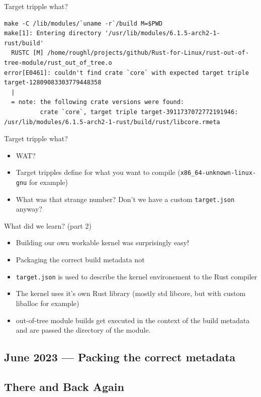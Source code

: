 \begin{frame}[c,fragile]{Target tripple what?}
  \begin{verbatim}
make -C /lib/modules/`uname -r`/build M=$PWD
make[1]: Entering directory '/usr/lib/modules/6.1.5-arch2-1-rust/build'
  RUSTC [M] /home/roughl/projects/github/Rust-for-Linux/rust-out-of-tree-module/rust_out_of_tree.o
error[E0461]: couldn't find crate `core` with expected target triple target-12809083303779448358
  |
  = note: the following crate versions were found:
          crate `core`, target triple target-3911737072772191946: /usr/lib/modules/6.1.5-arch2-1-rust/build/rust/libcore.rmeta
  \end{verbatim}
\end{frame}

\begin{frame}[c,fragile]{Target tripple what?}
  \begin{itemize}
    \item WAT?
    \item Target tripples define for what you want to compile
      (\texttt{x86\_64-unknown-linux-gnu} for example)
    \item What was that strange number? Don't we have a custom
      \texttt{target.json} anyway?
  \end{itemize}
\end{frame}

\begin{frame}[c]{What did we learn? (part 2)}
  \small
  \begin{itemize}
    \item Building our own workable kernel was surprisingly easy!
    \item Packaging the correct build metadata not
    \item \texttt{target.json} is used to describe the kernel environement to
      the Rust compiler
    \item The kernel uses it's own Rust library (mostly std libcore, but with
      custom liballoc for example)
    \item out-of-tree module builds get executed in the context of the build
      metadata and are passed the directory of the module.
  \end{itemize}
\end{frame}

\subsection{June 2023 — Packing the correct metadata}

\subsection{There and Back Again}
